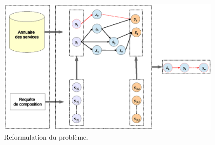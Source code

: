 \begin{figure}[h]
    \centering
    \includegraphics[width=1.15\textwidth]{figs/ch3/reformulation.eps}
    \caption{Reformulation du problème.}
    \label{fig:ch3/reformulation}
\end{figure}
